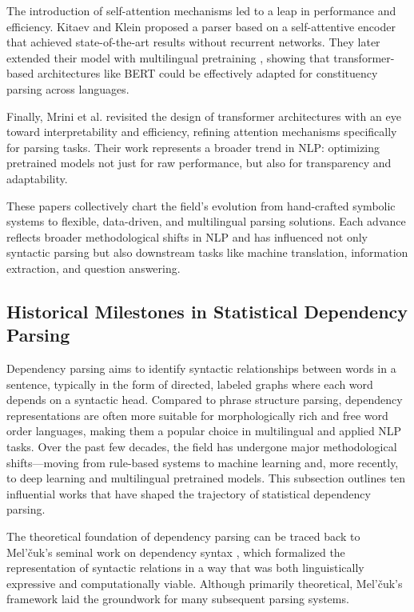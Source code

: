 The introduction of self-attention mechanisms led to a leap in performance and efficiency. Kitaev and Klein \cite{kitaev2018constituency} proposed a parser based on a self-attentive encoder that achieved state-of-the-art results without recurrent networks. They later extended their model with multilingual pretraining \cite{kitaev2019multilingual}, showing that transformer-based architectures like BERT could be effectively adapted for constituency parsing across languages.

Finally, Mrini et al. \cite{mrini2020rethinking} revisited the design of transformer architectures with an eye toward interpretability and efficiency, refining attention mechanisms specifically for parsing tasks. Their work represents a broader trend in NLP: optimizing pretrained models not just for raw performance, but also for transparency and adaptability.

These papers collectively chart the field’s evolution from hand-crafted symbolic systems to flexible, data-driven, and multilingual parsing solutions. Each advance reflects broader methodological shifts in NLP and has influenced not only syntactic parsing but also downstream tasks like machine translation, information extraction, and question answering.


\subsection{Historical Milestones in Statistical Dependency Parsing}

Dependency parsing aims to identify syntactic relationships between words in a sentence, typically in the form of directed, labeled graphs where each word depends on a syntactic head. Compared to phrase structure parsing, dependency representations are often more suitable for morphologically rich and free word order languages, making them a popular choice in multilingual and applied NLP tasks. Over the past few decades, the field has undergone major methodological shifts—moving from rule-based systems to machine learning and, more recently, to deep learning and multilingual pretrained models. This subsection outlines ten influential works that have shaped the trajectory of statistical dependency parsing.

The theoretical foundation of dependency parsing can be traced back to Mel’čuk’s seminal work on dependency syntax \cite{melcuk1988dependency}, which formalized the representation of syntactic relations in a way that was both linguistically expressive and computationally viable. Although primarily theoretical, Mel’čuk’s framework laid the groundwork for many subsequent parsing systems.

